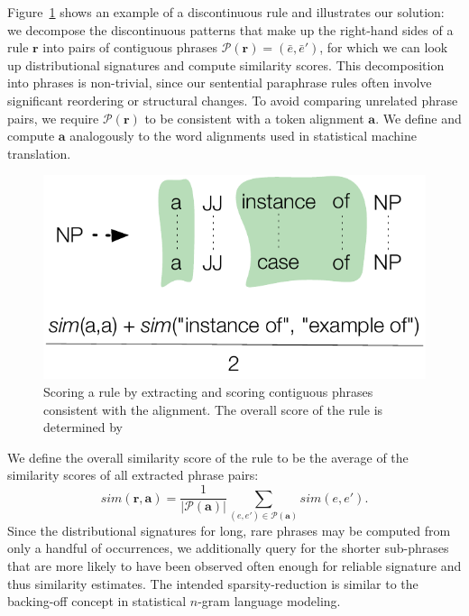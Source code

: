 \documentclass[11pt]{article}
\begin{document}
Figure~\ref{fig-pattern-scoring} shows an example of a discontinuous
rule and illustrates our solution: we decompose the discontinuous
patterns that make up the right-hand sides of a rule $\mathbf{r}$ into
pairs of contiguous phrases $\mathcal{P}(\mathbf{r}) = (\bar{e},
\bar{e}')$, for which we can look up distributional signatures and
compute similarity scores. This decomposition into phrases is
non-trivial, since our sentential paraphrase rules often involve
significant reordering or structural changes. To avoid comparing
unrelated phrase pairs, we require $\mathcal{P}(\mathbf{r})$ to be
consistent with a token alignment $\mathbf{a}$. We define and compute
$\mathbf{a}$ analogously to the word alignments used in statistical
machine translation.

\begin{figure}[!t]
\begin{center}
\includegraphics[width=0.85\linewidth]{figures/pattern_scoring.pdf}
\end{center}
\caption{Scoring a rule by extracting and scoring contiguous phrases
  consistent with the alignment. The overall score of the rule is
  determined by}\label{fig-pattern-scoring}
\end{figure}

We define the overall similarity score of the rule to be the average
of the similarity scores of all extracted phrase pairs:
\begin{equation*}
  \mathit{sim}(\mathbf{r}, \mathbf{a}) = \frac{1}{|\mathcal{P}(\mathbf{a})|}
  \sum_{(e, e') \in \mathcal{P}(\mathbf{a})}\mathit{sim}(e, e') .
\end{equation*}
Since the distributional signatures for long, rare phrases may be
computed from only a handful of occurrences, we additionally query for
the shorter sub-phrases that are more likely to have been observed
often enough for reliable signature and thus similarity estimates. The
intended sparsity-reduction is similar to the backing-off concept in
statistical $n$-gram language modeling.
\end{document}
